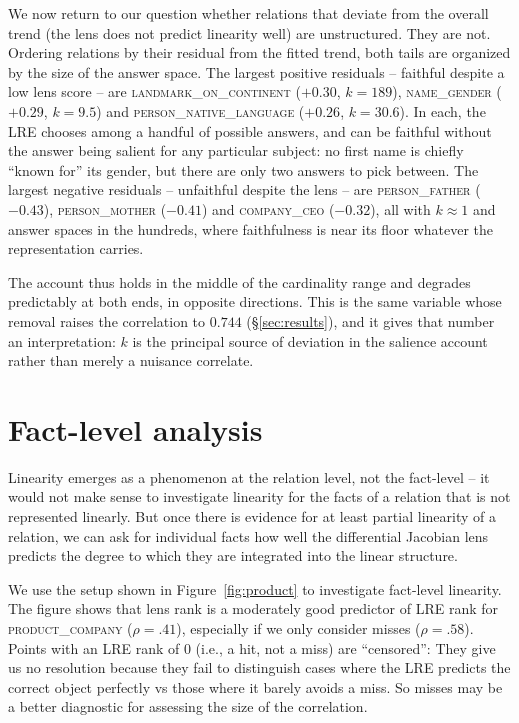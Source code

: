 \documentclass[11pt]{article}
\begin{document}
We now return to our question whether
relations that deviate from the overall trend (the lens does
not predict linearity well) are unstructured.
They are not. Ordering relations by their residual from the fitted trend,
both tails are organized by the size of the answer space. The largest
positive residuals -- faithful despite a low lens score -- are
\textsc{landmark\_on\_continent} ($+0.30$, $k = 189$),
\textsc{name\_gender} ($+0.29$, $k = 9.5$) and
\textsc{person\_native\_language} ($+0.26$, $k = 30.6$). In each, the LRE
chooses among a handful of possible answers, and can be faithful without
the answer being salient for any particular subject: no first name is
chiefly ``known for'' its gender, but there are only two answers to pick
between. The largest negative residuals -- unfaithful despite the lens --
are \textsc{person\_father} ($-0.43$), \textsc{person\_mother} ($-0.41$)
and \textsc{company\_ceo} ($-0.32$), all with $k \approx 1$ and answer
spaces in the hundreds, where faithfulness is near its floor whatever the
representation carries.

The account thus holds in the middle of the cardinality range and
degrades predictably at both ends, in opposite directions. This is the
same variable whose removal raises the correlation to
$0.744$ (\S\ref{sec:results}), and it
gives that number an interpretation: $k$ is the
principal source of deviation in the salience account rather than
merely a nuisance correlate.

\section{Fact-level analysis}
\label{sec:subject}
Linearity emerges as a phenomenon at the relation level, not
the fact-level -- it would not make sense to investigate
linearity for the facts of a relation that is not
represented linearly. But
once there is evidence for at least partial linearity of a
relation, we can ask for individual facts how well
the differential Jacobian lens predicts the degree to which
they are
integrated into the linear structure.

We use the setup shown in Figure~\ref{fig:product} to
investigate fact-level linearity. The figure shows that lens
rank is a moderately good predictor of LRE rank for
\textsc{product\_company} ($\rho=.41$), especially if we
only consider misses ($\rho=.58$). Points with an LRE rank
of 0 (i.e., a hit, not a miss) are ``censored'': They give
us no resolution because they fail to distinguish cases
where the LRE predicts the correct object perfectly vs
those where it barely avoids a miss. So
misses may be a better diagnostic for assessing the size of
the correlation.
\end{document}
